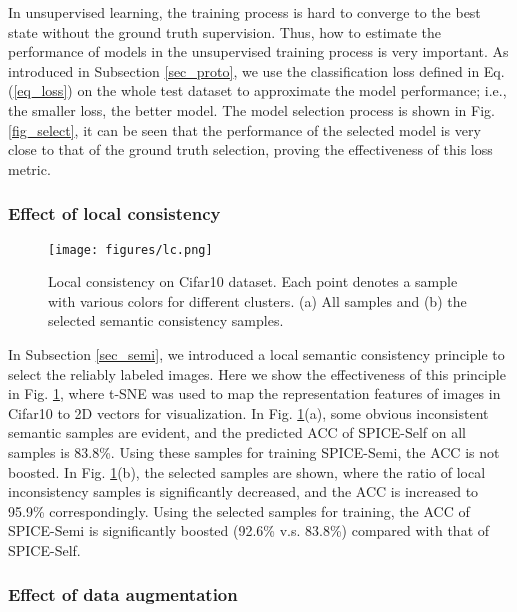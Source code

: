 \documentclass[10pt,twocolumn,letterpaper]{article}
\begin{document}
In unsupervised learning, the training process is hard to converge to the best state without the ground truth supervision. Thus, how to estimate the performance of models in the unsupervised training process is very important. As introduced in Subsection \ref{sec_proto}, we use the classification loss defined in Eq. (\ref{eq_loss}) on the whole test dataset to approximate the model performance; i.e., the smaller loss, the better model. The model selection process is shown in Fig. \ref{fig_select}, it can be seen that the performance of the selected model is very close to that of the ground truth selection, proving the effectiveness of this loss metric.



\subsubsection{Effect of local consistency}

\begin{figure}[hbt!]
    \centering
    \texttt{[image: figures/lc.png]}
    \caption{Local consistency on Cifar10 dataset. Each point denotes a sample with various colors for different clusters. (a) All samples and (b) the selected semantic consistency samples.}
    \label{fig_lc}
\end{figure}

In Subsection \ref{sec_semi}, we introduced a local semantic consistency principle to select the reliably labeled images. Here we show the effectiveness of this principle in Fig. \ref{fig_lc}, where t-SNE was used to map the representation features of images in Cifar10 to 2D vectors for visualization. In Fig. \ref{fig_lc}(a), some obvious inconsistent semantic samples are evident, and the predicted ACC of SPICE-Self on all samples is 83.8\%. Using these samples for training SPICE-Semi, the ACC is not boosted. In Fig. \ref{fig_lc}(b), the selected samples are shown, where the ratio of local inconsistency samples is significantly decreased, and the ACC is increased to 95.9\% correspondingly. Using the selected samples for training, the ACC of SPICE-Semi is significantly boosted (92.6\% v.s. 83.8\%) compared with that of SPICE-Self.



\subsubsection{Effect of data augmentation}
\end{document}
